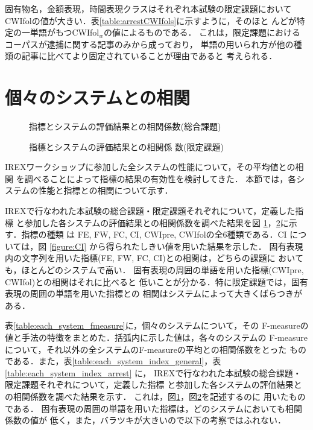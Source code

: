 固有物名，金額表現，時間表現クラスはそれぞれ本試験の限定課題において
CWIfolの値が大きい．表\ref{table:arrestCWIfols}に示すように，そのほと
んどが特定の一単語がもつCWIfol$_w$の値によるものである．
これは，限定課題におけるコーパスが逮捕に関する記事のみから成っており，
単語の用いられ方が他の種類の記事に比べてより固定されていることが理由であると
考えられる．


	   
\section{個々のシステムとの相関}

\begin{figure}[tb]
\begin{center}
\end{center}
\caption{\label{figure:hist_graphs_g}指標とシステムの評価結果との相関係数(総合課題)}
\end{figure}

\begin{figure}[tb]
\begin{center}
\end{center}
\caption{\label{figure:hist_graphs_a}指標とシステムの評価結果との相関係
 数(限定課題)}
\end{figure}

IREXワークショップに参加した全システムの性能について，その平均値との相関
を調べることによって指標の結果の有効性を検討してきた．
本節では，各システムの性能と指標との相関について示す．

IREXで行なわれた本試験の総合課題・限定課題それぞれについて，定義した指標
と参加した各システムの評価結果との相関係数を調べた結果を図
\ref{figure:hist_graphs_g}，\ref{figure:hist_graphs_a}に示す．指標の種類
は FE, FW, FC, CI, CWIpre, CWIfolの全6種類である．CI については，図
\ref{figure:CI} から得られたしきい値を用いた結果を示した．
固有表現内の文字列を用いた指標(FE, FW, FC, CI)との相関は，どちらの課題に
おいても，ほとんどのシステムで高い．
固有表現の周囲の単語を用いた指標(CWIpre, CWIfol)との相関はそれに比べると
低いことが分かる．特に限定課題では，固有表現の周囲の単語を用いた指標との
相関はシステムによって大きくばらつきがある．

表\ref{table:each_system_fmeasure}に，個々のシステムについて，その
F-measureの値と手法の特徴をまとめた．括弧内に示した値は，各々のシステムの
F-measureについて，それ以外の全システムのF-measureの平均との相関係数をとった
ものである．また，表\ref{table:each_system_index_general}，表
\ref{table:each_system_index_arrest} に，
IREXで行なわれた本試験の総合課題・限定課題それぞれについて，定義した指標
と参加した各システムの評価結果との相関係数を調べた結果を示す．
これは，図\ref{figure:hist_graphs_g}，図\ref{figure:hist_graphs_a}を記述するのに
用いたものである．
固有表現の周囲の単語を用いた指標は，どのシステムにおいても相関係数の値が
低く，また，バラツキが大きいので以下の考察ではふれない．

